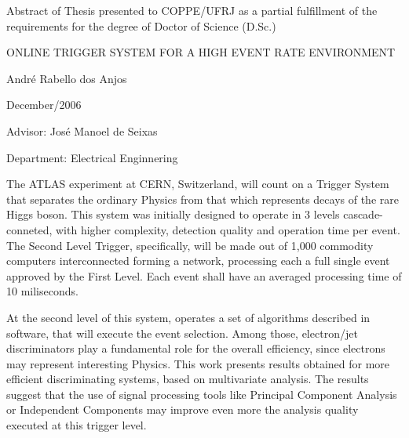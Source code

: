 \clearpage

\noindent
Abstract of Thesis presented to COPPE/UFRJ as a partial fulfillment of the
\linebreak requirements for the degree of Doctor of Science (D.Sc.)

\vspace{1.5cm}

\begin{center}
ONLINE TRIGGER SYSTEM FOR A HIGH EVENT RATE ENVIRONMENT 
\vspace{1cm}

André Rabello dos Anjos
\vspace{1cm}

December/2006
\end{center}
\vspace{2cm}

\noindent
Advisor: José Manoel de Seixas
\vspace{2cm}

\noindent
Department: Electrical Enginnering
\vspace{2cm}

\begin{summary}{1.2}
\hspace{0.8cm}The ATLAS experiment at CERN, Switzerland, will count on a
Trigger System that separates the ordinary Physics from that which represents
decays of the rare Higgs boson. This system was initially designed to operate
in 3 levels cascade-conneted, with higher complexity, detection quality and
operation time per event. The Second Level Trigger, specifically, will be made
out of 1,000 commodity computers interconnected forming a network, processing
each a full single event approved by the First Level. Each event shall have an
averaged processing time of 10 miliseconds.

At the second level of this system, operates a set of algorithms described in
software, that will execute the event selection. Among those, electron/jet
discriminators play a fundamental role for the overall efficiency, since
electrons may represent interesting Physics. This work presents results
obtained for more efficient discriminating systems, based on multivariate
analysis. The results suggest that the use of signal processing tools like
Principal Component Analysis or Independent Components may improve even more
the analysis quality executed at this trigger level.
\end{summary}
